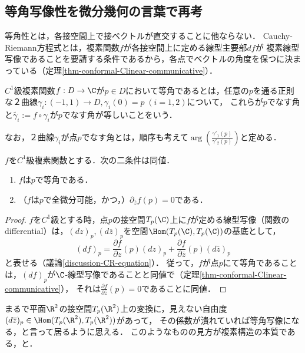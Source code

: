 \documentclass[uplatex, dvipdfmx]{jsreport}
\begin{document}
\subsection{等角写像性を微分幾何の言葉で再考}

\begin{screen}
    等角性とは，各接空間上で接ベクトルが直交することに他ならない．
    Cauchy-Riemann方程式とは，複素関数$f$が各接空間上に定める線型主要部$df$が
    複素線型写像であることを要請する条件であるから，各点でベクトルの角度を保つに決まっている（定理\ref{thm-conformal-Clinear-communicative}）．
\end{screen}

\begin{definition}[conformal]
    $C^1$級複素関数$f:D\to\C$が$p\in D$において等角であるとは，任意の$p$を通る正則な２曲線$\gamma_i:(-1,1)\to D, \gamma_i(0)=p\;(i=1,2)$について，
    これらが$p$でなす角と$\tilde{\gamma_i}:=f\circ\gamma_i$が$p$でなす角が等しいことをいう．
    
    なお，２曲線$\gamma_i$が点$p$でなす角とは，順序も考えて$\arg\left(\frac{\gamma'_1(p)}{\gamma'_2(p)}\right)$と定める．
\end{definition}

\begin{theorem}[等角写像の特徴付け]\label{thm-charactorization-of-conformal-mappings}
    $f$を$C^1$級複素関数とする．次の二条件は同値．
    \begin{enumerate}
        \item $f$は$p$で等角である．
        \item （$f$は$p$で全微分可能，かつ，）$\partial_{\overline{z}}f(p)=0$である．
    \end{enumerate}
\end{theorem}
\begin{proof}
    $f$を$C^1$級とする時，点$p$の接空間$T_p(\C)$上に$f$が定める線型写像（関数のdifferential）は，$(dz)_p,(d\overline{z})_p$を空間$\Hom(T_p(\C),T_p(\C))$の基底として，
    \[ (df)_p=\frac{\partial f}{\partial z}(p)(dz)_p + \frac{\partial f}{\partial\overline{z}}(p)(d\overline{z})_p \]
    と表せる（議論\ref{discussion-CR-equation}）．
    従って，$f$が点$p$にて等角であることは，$(df)_p$が$\C$-線型写像であることと同値で（定理\ref{thm-conformal-Clinear-communicative}），
    それは$\frac{\partial f}{\partial\overline{z}}(p)=0$であることに同値．
\end{proof}
\begin{remark}
    まるで平面$\R^2$の接空間$T_p(\R^2)$上の変換に，見えない自由度$(d\overline{z})_p\in\Hom(T_p(\R^2),T_p(\R^2))$があって，
    その係数が潰れていれば等角写像になる，と言って居るように思える．
    このようなものの見方が複素構造の本質である，と．
\end{remark}
\end{document}
